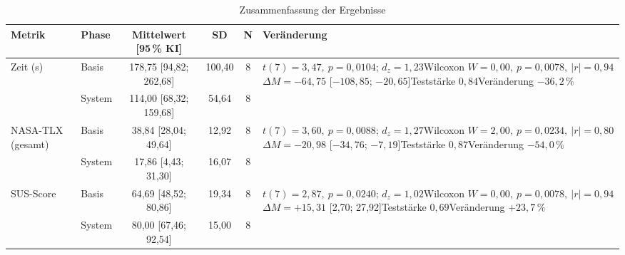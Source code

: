 \begin{landscape}
\begin{table}[h]
\begin{tabular}{|l|l|c|c|c|p{12cm}|}
\hline
\textbf{Metrik} & \textbf{Phase} & \textbf{Mittelwert [95\,\% KI]} & \textbf{SD} & \textbf{N} & \textbf{Veränderung} \\
\hline\hline
Zeit (s) & Basis  & 178{,}75 [94{,}82; 262{,}68] & 100{,}40 & 8 &
$t(7)=3{,}47,\ p=0{,}0104$; $d_z=1{,}23$\newline Wilcoxon $W=0{,}00,\ p=0{,}0078,\ |r|=0{,}94$\newline
$\Delta M=-64{,}75$ [$-108{,}85$; $-20{,}65$]\newline Teststärke $0{,}84$\newline Veränderung $-36{,}2\,\%$ \\
& System & 114{,}00 [68{,}32; 159{,}68] & 54{,}64 & 8 & \\
\hline\hline
NASA-TLX (gesamt) & Basis  & 38{,}84 [28{,}04; 49{,}64] & 12{,}92 & 8 &
$t(7)=3{,}60,\ p=0{,}0088$; $d_z=1{,}27$\newline Wilcoxon $W=2{,}00,\ p=0{,}0234,\ |r|=0{,}80$\newline
$\Delta M=-20{,}98$ [$-34{,}76$; $-7{,}19$]\newline Teststärke $0{,}87$\newline Veränderung $-54{,}0\,\%$ \\
& System & 17{,}86 [4{,}43; 31{,}30]  & 16{,}07 & 8 & \\
\hline\hline
SUS-Score & Basis  & 64{,}69 [48{,}52; 80{,}86] & 19{,}34 & 8 &
$t(7)=2{,}87,\ p=0{,}0240$; $d_z=1{,}02$\newline Wilcoxon $W=0{,}00,\ p=0{,}0078,\ |r|=0{,}94$\newline
$\Delta M=+15{,}31$ [2{,}70; 27{,}92]\newline Teststärke $0{,}69$\newline Veränderung $+23{,}7\,\%$ \\
& System & 80{,}00 [67{,}46; 92{,}54] & 15{,}00 & 8 & \\
\hline
\end{tabular}
\caption{Zusammenfassung der Ergebnisse}
\label{tab:stats_summary_stacked}
\end{table}
\end{landscape}

\FloatBarrier

